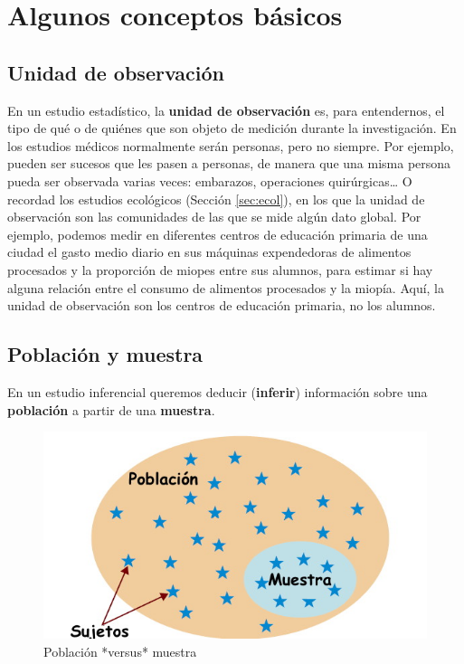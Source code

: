 \documentclass[
]{book}
\theoremstyle{definition}
\theoremstyle{definition}
\theoremstyle{definition}
\theoremstyle{definition}
\theoremstyle{remark}
\begin{document}
\hypertarget{algunos-conceptos-buxe1sicos}{%
\chapter{Algunos conceptos básicos}\label{algunos-conceptos-buxe1sicos}}

\hypertarget{unidad-de-observaciuxf3n}{%
\section{Unidad de observación}\label{unidad-de-observaciuxf3n}}

En un estudio estadístico, la \textbf{unidad de observación} es, para entendernos, el tipo de qué o de quiénes que son objeto de medición durante la investigación. En los estudios médicos normalmente serán personas, pero no siempre. Por ejemplo, pueden ser sucesos que les pasen a personas, de manera que una misma persona pueda ser observada varias veces: embarazos, operaciones quirúrgicas\ldots{} O recordad los estudios ecológicos (Sección \ref{sec:ecol}), en los que la unidad de observación son las comunidades de las que se mide algún dato global. Por ejemplo, podemos medir en diferentes centros de educación primaria de una ciudad el gasto medio diario en sus máquinas expendedoras de alimentos procesados y la proporción de miopes entre sus alumnos, para estimar si hay alguna relación entre el consumo de alimentos procesados y la miopía. Aquí, la unidad de observación son los centros de educación primaria, no los alumnos.

\hypertarget{poblaciuxf3n-y-muestra}{%
\section{Población y muestra}\label{poblaciuxf3n-y-muestra}}

En un estudio inferencial queremos deducir (\textbf{inferir}) información sobre una \textbf{población} a partir de una \textbf{muestra}.

\begin{figure}

{\centering \includegraphics[width=0.6\linewidth]{INREMDN_files/figure-html/samplingcast} 

}

\caption{Población *versus* muestra}\label{fig:samplingcast}
\end{figure}
\end{document}
